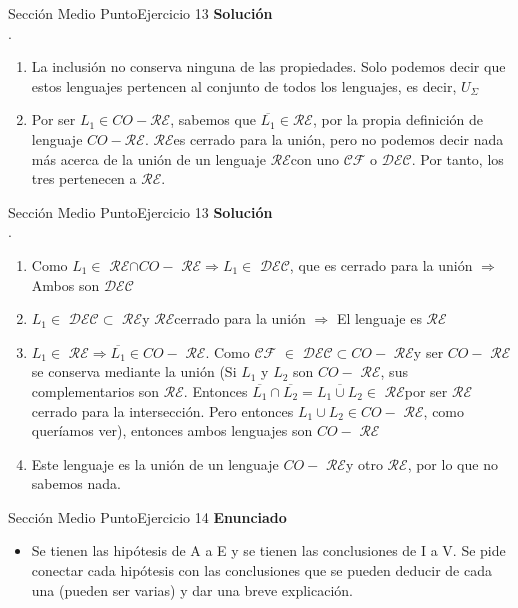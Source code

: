 \documentclass[10pt, envcountsect, presentation, aspectratio=169]{beamer}
\newcommand{\ld}{\ensuremath{\mathcal {DEC}}}
\newcommand{\lr}{\ensuremath{\mathcal {RE}}}
\begin{document}
\begin{frame}{Sección Medio Punto}{Ejercicio 13}
    \textbf{Solución}\\
    .
    \begin{enumerate}[label=(\arabic*)]
        \item[(4, 5, 6)] La inclusión no conserva ninguna de las propiedades. Solo podemos decir que estos lenguajes pertencen al conjunto de todos los lenguajes, es decir, $U_\Sigma$
        \item[(7, 8, 9)] Por ser $L_1 \in CO-\lr$, sabemos que $\overline{L_1} \in \lr$, por la propia definición de lenguaje $CO-\lr$. \lr \space es cerrado para la unión, pero no podemos decir nada más acerca de la unión de un lenguaje \lr \space con uno $\mathcal{CF}$ \space o \ld. Por tanto, los tres pertenecen a \lr.
    \end{enumerate}
\end{frame}

\begin{frame}{Sección Medio Punto}{Ejercicio 13}
    \textbf{Solución}\\
    .
    \begin{enumerate}[label=(\arabic*)]
        \item[(10, 11)] Como $L_1 \in$ \lr $\cap CO-$ \lr $\Rightarrow L_1 \in$ \ld, que es cerrado para la unión $\Rightarrow$ Ambos son \ld
        \item[(12)] $L_1\in$ \ld $\subset$ \lr y  \lr \space cerrado para la unión $\Rightarrow$ El lenguaje es \lr
        \item[(13, 14)] $L_1 \in$ \lr $\Rightarrow \overline{L_1} \in CO-$ \lr. Como $\mathcal{CF}$ $\in$ \ld $\subset CO-$ \lr y ser $CO-$ \lr se conserva mediante la unión (Si $L_1$ y $L_2$ son $CO-$ \lr, sus complementarios son \lr. Entonces $\overline{L_1} \cap \overline{L_2} = \overline{L_1 \cup L_2} \in$ \lr por ser \lr cerrado para la intersección. Pero entonces $L_1 \cup L_2 \in CO-$ \lr, como queríamos ver), entonces ambos lenguajes son $CO-$ \lr
        \item[(15)] Este lenguaje es la unión de un lenguaje $CO-$ \lr y otro \lr, por lo que no sabemos nada.
    \end{enumerate}
\end{frame}

\begin{frame}{Sección Medio Punto}{Ejercicio 14}
    \textbf{Enunciado}
    \begin{itemize}
        \item Se tienen las hipótesis de A a E y se tienen las conclusiones de I a V. Se pide conectar cada hipótesis con las conclusiones que se pueden deducir de cada una (pueden ser varias) y dar una breve explicación.
    \end{itemize}
\end{frame}
\end{document}
